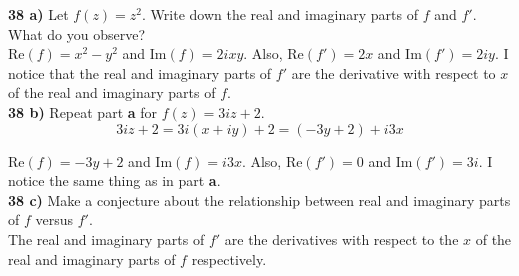 \documentclass{scrartcl}
\begin{document}
\textbf{38 a)} Let $f(z) = z^2$. Write down the real and imaginary parts of $f$ and $f'$. What do you observe?\\

Re$(f) = x^2 - y^2$ and Im$(f) = 2ixy$. Also, Re$(f') = 2x$ and Im$(f') = 2iy$. I notice that the real and imaginary parts of $f'$ are the derivative with respect to $x$ of the real and imaginary parts of $f$.\\

\textbf{38 b)} Repeat part \textbf{a} for $f(z) = 3iz + 2$.\\

$$3iz + 2 = 3i(x + iy) + 2 = (-3y + 2) + i3x$$

Re$(f) = -3y + 2$ and Im$(f) = i3x$. Also, Re$(f') = 0$ and Im$(f') = 3i$. I notice the same thing as in part \textbf{a}.\\

\textbf{38 c)} Make a conjecture about the relationship between real and imaginary parts of $f$ versus $f'$.\\

The real and imaginary parts of $f'$ are the derivatives with respect to the $x$ of the real and imaginary parts of $f$ respectively.
\end{document}
